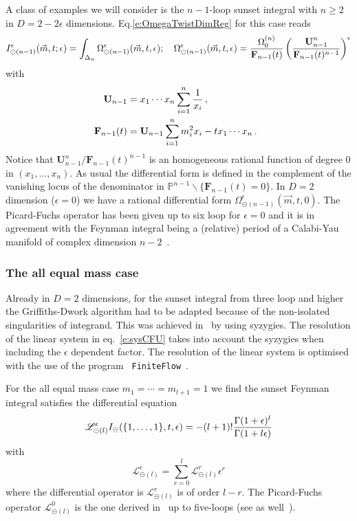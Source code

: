\documentclass[a4paper,12pt]{article}
\numberwithin{equation}{section}
\numberwithin{figure}{section}
\def\su{\circleddash}
\begin{document}
A class of examples we will consider is  
the $n-1$-loop sunset integral with $n\geq2$ in $D=2-2\epsilon$ dimensions. Eq.\eqref{e:OmegaTwistDimReg} for this case reads
\begin{equation}
  I^{\epsilon}_{\su(n-1)}(\vec m,t;\epsilon)= \int_{\Delta_n} \Omega^{\epsilon}_{\su(n-1)}(\vec m,t,\epsilon)  ; \quad
  \Omega^\epsilon_{\su(n-1)}(\vec m, t,\epsilon)={\Omega^{(n)}_0\over
    \textbf{F}_{n-1}(t)}\left(\textbf{U}_{n-1}^n\over \textbf{F}_{n-1}(t)^{n-1}\right)^\epsilon
\end{equation}
with
\begin{align}
  \textbf{ U}_{n-1}&= x_1\cdots x_n\sum_{i=1}^n {1\over x_i}\,, \cr
      \textbf{   F}_{n-1}(t)&= \textbf{U}_{n-1} \sum_{i=1}^n m_i^2x_i-t x_1\cdots x_n \, .
\end{align}
Notice that $\textbf{U}_{n-1}^n/ \textbf{F}_{n-1}(t)^{n-1}$ is an homogeneous
rational function  of degree
0 in $(x_1,\dots,x_n)$. As usual the differential form is defined in
the complement of the vanishing locus of the denominator in $\mathbb P^{n-1}\backslash\{\textbf{F}_{n-1}(t)=0\}$.
In $D=2$ dimension ($\epsilon=0$) we have a rational  differential form
$ \Omega_{\su(n-1)}^{\epsilon}(\vec m,t,0)$. The Picard-Fuchs operator has been
given up to six loop  for $\epsilon=0$ and it is in agreement with the Feynman integral
being a (relative) period of a Calabi-Yau  manifold of complex dimension $n-2$~\cite{Bloch:2013tra,Bloch:2014qca,Bloch:2016izu,Bourjaily:2019hmc,Bonisch:2020qmm,Bonisch:2021yfw,Candelas:2021lkc,Forum:2022lpz}.


   \subsubsection{The all equal mass case}\label{sec:highersunset1mass}
Already in $D=2$ dimensions, for the sunset integral from three loop
and higher  the Griffiths-Dwork algorithm had to be adapted because of
the non-isolated singularities of integrand. This was achieved
in~\cite{Lairez:2022zkj} by using syzygies. The resolution of the
linear system in eq.~\eqref{e:sysCFU} takes into account the syzygies
when including the $\epsilon$ dependent factor.   The resolution of
the linear system is optimised with the use of the program {\tt
  FiniteFlow}~\cite{Peraro:2019svx}.


   
For the all equal mass case $m_1=\cdots =m_{l+1}=1$ we find the sunset
Feynman integral satisfies the differential equation
\begin{equation}
  \mathscr{L}_{\su(l)}^\epsilon I_\su(\{1,\dots,1\},t,\epsilon)=
  -(l+1)! {\Gamma(1+\epsilon)^l\over \Gamma(1+l\epsilon)}
\end{equation}
with
\begin{equation}
  \mathscr{L}_{\su(l)}^{\epsilon} =\sum_{r=0}^{l}  \mathscr{L}_{\su(l)}^{r} \epsilon^r
\end{equation}
where the differential operator is $ \mathscr{L}_{\su(l)}^{r}$ is of
order $l-r$. The Picard-Fuchs operator $ \mathscr{L}_{\su(l)}^{0}$ is
the one derived in~\cite{Vanhove:2014wqa} up to five-loops (see as well~\cite{Bonisch:2020qmm,Pogel:2022yat,Pogel:2022ken,Pogel:2022vat}).
\end{document}
